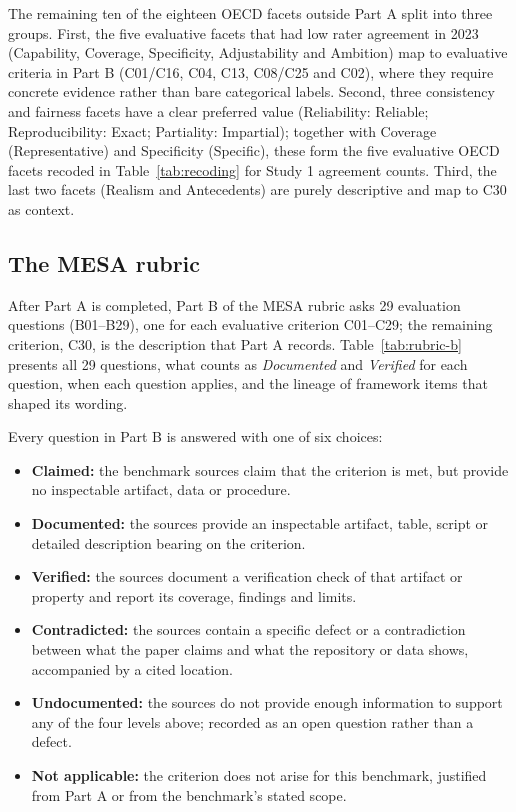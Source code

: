 \documentclass[10pt,conference]{IEEEtran}
\begin{document}
The remaining ten of the eighteen OECD facets outside Part A split into three groups. First, the five evaluative facets that had low rater agreement in 2023 (Capability, Coverage, Specificity, Adjustability and Ambition) map to evaluative criteria in Part B (C01/C16, C04, C13, C08/C25 and C02), where they require concrete evidence rather than bare categorical labels. Second, three consistency and fairness facets have a clear preferred value (Reliability: Reliable; Reproducibility: Exact; Partiality: Impartial); together with Coverage (Representative) and Specificity (Specific), these form the five evaluative OECD facets recoded in Table~\ref{tab:recoding} for Study 1 agreement counts. Third, the last two facets (Realism and Antecedents) are purely descriptive and map to C30 as context.

\subsection{The MESA rubric}
\label{sec:rubric}
After Part A is completed, Part B of the MESA rubric asks 29 evaluation questions (B01--B29), one for each evaluative criterion C01--C29; the remaining criterion, C30, is the description that Part A records. Table~\ref{tab:rubric-b} presents all 29 questions, what counts as \emph{Documented} and \emph{Verified} for each question, when each question applies, and the lineage of framework items that shaped its wording.

Every question in Part B is answered with one of six choices:
\begin{itemize}
\item \textbf{Claimed:} the benchmark sources claim that the criterion is met, but provide no inspectable artifact, data or procedure.
\item \textbf{Documented:} the sources provide an inspectable artifact, table, script or detailed description bearing on the criterion.
\item \textbf{Verified:} the sources document a verification check of that artifact or property and report its coverage, findings and limits.
\item \textbf{Contradicted:} the sources contain a specific defect or a contradiction between what the paper claims and what the repository or data shows, accompanied by a cited location.
\item \textbf{Undocumented:} the sources do not provide enough information to support any of the four levels above; recorded as an open question rather than a defect.
\item \textbf{Not applicable:} the criterion does not arise for this benchmark, justified from Part A or from the benchmark's stated scope.
\end{itemize}
\end{document}
